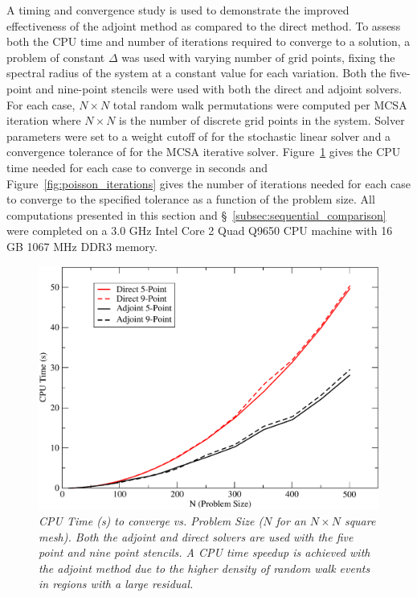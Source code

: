 \documentclass[preprint,12pt]{elsarticle}
\begin{document}
A timing and convergence study is used to demonstrate the improved
effectiveness of the adjoint method as compared to the direct method. To
assess both the CPU time and number of iterations required to converge to a
solution, a problem of constant $\Delta$ was used with varying number of grid
points, fixing the spectral radius of the system at a constant value for each
variation. Both the five-point and nine-point stencils were used with both the
direct and adjoint solvers. For each case, $N \times N$ total random walk
permutations were computed per MCSA iteration where $N \times N$ is the number
of discrete grid points in the system. Solver parameters were set to a weight
cutoff of  for the stochastic linear solver and a convergence
tolerance of  for the MCSA iterative solver.
Figure~\ref{fig:poisson_cpu_time} gives the CPU time needed for each case to
converge in seconds and Figure~\ref{fig:poisson_iterations} gives the number
of iterations needed for each case to converge to the specified tolerance as a
function of the problem size. All computations presented in this section and
\S~\ref{subsec:sequential_comparison} were completed on a 3.0 GHz Intel Core 2
Quad Q9650 CPU machine with 16 GB 1067 MHz DDR3 memory.
\begin{figure}[ht!]
  \centering
  \includegraphics[width=5in,clip]{dir_adj_cpu.pdf}
  \caption{\sl CPU Time (s) to converge vs. Problem Size ($N$ for an
    $N \times N$ square mesh). Both the adjoint and direct solvers are
    used with the five point and nine point stencils. A CPU time
    speedup is achieved with the adjoint method due to the higher density
    of random walk events in regions with a large residual.}
  \label{fig:poisson_cpu_time}
\end{figure}
\end{document}
